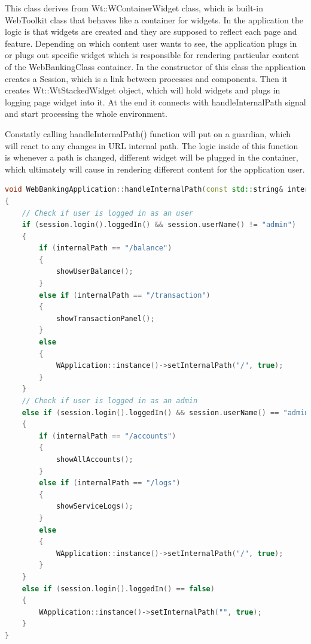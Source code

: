 \documentclass[a4paper,12pt]{book}
\begin{document}
{\bigskip
This class derives  from Wt::WContainerWidget class, which is built-in WebToolkit class that behaves like a container for widgets. In the application the logic is that widgets are created and they are supposed to reflect each page and feature. Depending on which content user wants to see, the application plugs in or plugs out specific widget which is responsible for rendering particular content of the WebBankingClass container. In the constructor of this class the application creates a Session, which is a link between processes and components. Then it creates Wt::WtStackedWidget object, which will hold widgets and plugs in logging page widget into it. At the end it connects with handleInternalPath signal and start processing the whole environment. 

\bigskip
Constatly calling handleInternalPath() function will put on a guardian, which will react to any changes in URL internal path. The logic inside of this function is whenever a path is changed, different widget will be plugged in the container, which ultimately will cause in rendering different content for the application user.

\bigskip
\begin{lstlisting}[frame=single, basicstyle=\small, language=C++, caption={handleInternalPath() function. It reacts to URL changes. Regarding the internal path, different content is being rendered. For instance if path is changed to localhost:8080/balance then this function checks if user is logged in. If so, showUserBalance() function is being called, which clears all current widgets and plugs in user balance widget, which will cause in displaying the balance of the currently logged in user. If the user is not logged, the path will be immediately changed to localhost:8080 and the logging page will be rendered.}, captionpos=b]
void WebBankingApplication::handleInternalPath(const std::string& internalPath)
{
	// Check if user is logged in as an user
	if (session.login().loggedIn() && session.userName() != "admin") 
	{
		if (internalPath == "/balance") 
		{								
			showUserBalance();
		}
		else if (internalPath == "/transaction")
		{
			showTransactionPanel();
		}
		else
		{
			WApplication::instance()->setInternalPath("/", true);
		}
	}
	// Check if user is logged in as an admin
	else if (session.login().loggedIn() && session.userName() == "admin")
	{
		if (internalPath == "/accounts")
		{
			showAllAccounts();
		}
		else if (internalPath == "/logs")
		{
			showServiceLogs();
		}
		else
		{
			WApplication::instance()->setInternalPath("/", true);
		}
	}
	else if (session.login().loggedIn() == false)
	{
		WApplication::instance()->setInternalPath("", true);
	}
}
\end{lstlisting}

}
\end{document}
